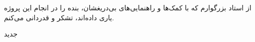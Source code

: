 


\begin{center}
\end{center}

از استاد بزرگوارم که با کمک‌ها و راهنمایی‌های بی‌دریغشان، بنده را در انجام این پروژه یاری داده‌اند، تشکر و قدردانی می‌کنم.

‌جدید
